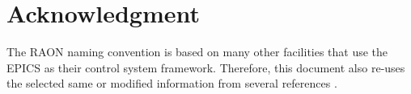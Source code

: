 \documentclass[11pt
  , a4paper
  , article
  , oneside
]{memoir}
\begin{document}
\chapter{Acknowledgment}
The RAON naming convention is based on many other facilities that use the EPICS as their control system framework. Therefore, this document also re-uses the selected same or modified information from several references  \cite{DaveGurd, NCSNS,NCESS, NCNSLSII}. 


\clearpage
%
%
%

%

\end{document}
